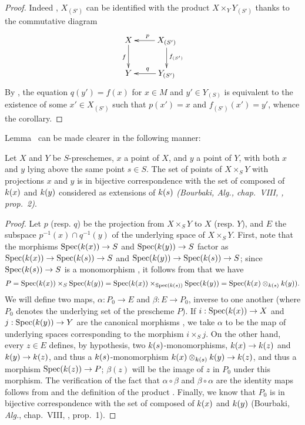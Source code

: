 \begin{proof}
Indeed , $X_{(S')}$ can be identified with the product $X\times_Y Y_{(S')}$ thanks to the commutative diagram
\[
  \xymatrix{
    X\ar[d]_f &
    X_{(S')}\ar[l]_p\ar[d]^{f_{(S')}}\\
    Y &
    Y_{(S')}\ar[l]_q
  }
\]
By , the equation $q(y')=f(x)$ for $x\in M$ and $y'\in Y_{(S)}$ is equivalent to the existence of some $x'\in X_{(S')}$ such that $p(x')=x$ and $f_{(S')}(x')=y'$, whence the corollary.
\end{proof}

Lemma~ can be made clearer in the following manner:
\begin{proposition}[3.4.9]
\label{I.3.4.9}
Let $X$ and $Y$ be $S$-preschemes, $x$ a point of $X$, and $y$ a point of $Y$, with both $x$ and $y$ lying above the same point $s\in S$.
The set of points of $X\times_S Y$ with projections $x$ and $y$ is in bijective correspondence with the set of  composed of $k(x)$ and $k(y)$ considered as extensions of $k(s)$ \emph{(Bourbaki, \emph{Alg.}, chap.~VIII, , prop.~2)}.
\end{proposition}

\begin{proof}
Let $p$ (resp. $q$) be the projection from $X\times_S Y$ to $X$ (resp. $Y$), and $E$ the subspace $p^{-1}(x)\cap q^{-1}(y)$ of the underlying space of $X\times_S Y$.
First, note that the morphisms $\Spec(\kres(x))\to S$ and $\Spec(\kres(y))\to S$ factor as $\Spec(\kres(x))\to\Spec(\kres(s))\to S$ and $\Spec(\kres(y))\to\Spec(\kres(s))\to S$; since $\Spec(\kres(s))\to S$ is a monomorphism , it follows from  that we have
\[
  P=\operatorname{Spec}(k(x))\times_S\operatorname{Spec}(k(y))=\operatorname{Spec}(k(x))\times_{\operatorname{Spec}(k(s))}\operatorname{Spec}(k(y))=\operatorname{Spec}(k(x)\otimes_{k(s)}k(y)).
\]
We will define two maps, $\alpha:P_0\to E$ and $\beta:E\to P_0$, inverse to one another (where $P_0$ denotes the underlying set of the prescheme $P$).
If $i:\Spec(\kres(x))\to X$ and $j:\Spec(\kres(y))\to Y$ are the canonical morphisms , we take $\alpha$ to be the map of underlying spaces corresponding to the morphism $i\times_S j$.
On the other hand, every $z\in E$ defines, by hypothesis, two $k(s)$-monomorphisms, $\kres(x)\to\kres(z)$ and $\kres(y)\to\kres(z)$, and thus a $k(s)$-monomorphism $\kres(x)\otimes_{\kres(s)}\kres(y)\to\kres(z)$, and thus a morphism $\Spec(\kres(z))\to P$; $\beta(z)$ will be the image of $z$ in $P_0$ under this morphism.
The verification of the fact that $\alpha\circ\beta$ and $\beta\circ\alpha$ are the identity maps follows from  and the definition of the product .
Finally, we know that $P_0$ is in bijective correspondence with the set of  composed of $k(x)$ and $k(y)$ (Bourbaki, \emph{Alg.}, chap.~VIII, , prop.~1).
\end{proof}

